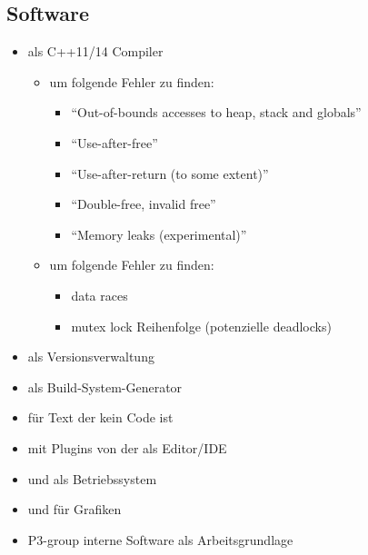   \subsection{Software}
  \label{ssec:software}
    \begin{itemize}
      \item {} als C++11/14 Compiler
        \begin{itemize}
          \item {} um folgende Fehler zu finden:
            \begin{itemize}
              \item ``Out-of-bounds accesses to heap, stack and globals''
              \item ``Use-after-free''
              \item ``Use-after-return (to some extent)''
              \item ``Double-free, invalid free''
              \item ``Memory leaks (experimental)''
            \end{itemize}
          \item {} um folgende Fehler zu finden:
            \begin{itemize}
              \item data races
              \item mutex lock Reihenfolge (potenzielle deadlocks)
             \end{itemize}
        \end{itemize}
      \item {} als Versionsverwaltung
      \item {} als Build-System-Generator
      \item {} für Text der kein Code ist
      \item {} mit Plugins von der  als Editor/IDE
      \item {} und  als Betriebssystem
      \item {} und  für Grafiken
      \item P3-group interne Software als Arbeitsgrundlage
    \end{itemize}

